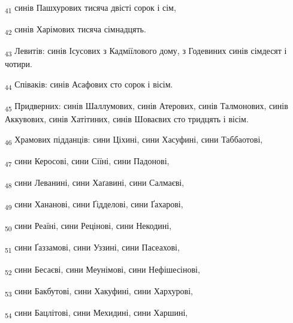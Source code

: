 \begin{tcolorbox}
\textsubscript{41} синів Пашхурових тисяча двісті сорок і сім,
\end{tcolorbox}
\begin{tcolorbox}
\textsubscript{42} синів Харімових тисяча сімнадцять.
\end{tcolorbox}
\begin{tcolorbox}
\textsubscript{43} Левитів: синів Ісусових з Кадміїлового дому, з Годевиних синів сімдесят і чотири.
\end{tcolorbox}
\begin{tcolorbox}
\textsubscript{44} Співаків: синів Асафових сто сорок і вісім.
\end{tcolorbox}
\begin{tcolorbox}
\textsubscript{45} Придверних: синів Шаллумових, синів Атерових, синів Талмонових, синів Аккувових, синів Хатітиних, синів Шоваєвих сто тридцять і вісім.
\end{tcolorbox}
\begin{tcolorbox}
\textsubscript{46} Храмових підданців: сини Ціхині, сини Хасуфині, сини Таббаотові,
\end{tcolorbox}
\begin{tcolorbox}
\textsubscript{47} сини Керосові, сини Сіїні, сини Падонові,
\end{tcolorbox}
\begin{tcolorbox}
\textsubscript{48} сини Леванині, сини Хаґавині, сини Салмаєві,
\end{tcolorbox}
\begin{tcolorbox}
\textsubscript{49} сини Хананові, сини Ґідделові, сини Ґахарові,
\end{tcolorbox}
\begin{tcolorbox}
\textsubscript{50} сини Реаїні, сини Рецінові, сини Некодині,
\end{tcolorbox}
\begin{tcolorbox}
\textsubscript{51} сини Ґаззамові, сини Уззині, сини Пасеахові,
\end{tcolorbox}
\begin{tcolorbox}
\textsubscript{52} сини Бесаєві, сини Меунімові, сини Нефішесінові,
\end{tcolorbox}
\begin{tcolorbox}
\textsubscript{53} сини Бакбутові, сини Хакуфині, сини Хархурові,
\end{tcolorbox}
\begin{tcolorbox}
\textsubscript{54} сини Бацлітові, сини Мехидині, сини Харшині,
\end{tcolorbox}
